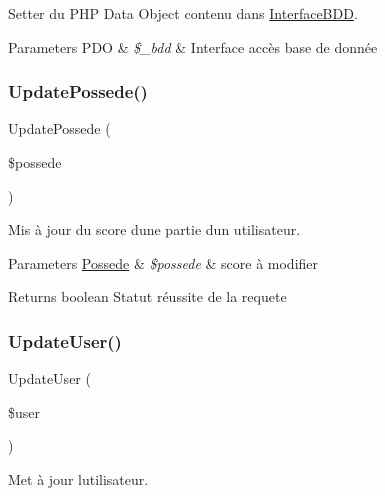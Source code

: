 Setter du P\+HP Data Object contenu dans \mbox{\hyperlink{class_interface_b_d_d}{Interface\+B\+DD}}. 


\begin{DoxyParams}[1]{Parameters}
P\+DO & {\em \$\+\_\+bdd} & Interface accès base de donnée \\
\hline
\end{DoxyParams}
\mbox{\label{class_interface_b_d_d_adff6bf7ab712728f7898296d73bbd71b}} 
\subsubsection{\texorpdfstring{Update\+Possede()}{UpdatePossede()}}
{\footnotesize\ttfamily Update\+Possede (\begin{DoxyParamCaption}\item[{}]{\$possede }\end{DoxyParamCaption})}



Mis à jour du score d\textquotesingle{}une partie d\textquotesingle{}un utilisateur. 


\begin{DoxyParams}[1]{Parameters}
\mbox{\hyperlink{class_possede}{Possede}} & {\em \$possede} & score à modifier\\
\hline
\end{DoxyParams}
\begin{DoxyReturn}{Returns}
boolean Statut réussite de la requete 
\end{DoxyReturn}
\mbox{\label{class_interface_b_d_d_abf7f8811487ce2a1626969ffbfcf7701}} 
\subsubsection{\texorpdfstring{Update\+User()}{UpdateUser()}}
{\footnotesize\ttfamily Update\+User (\begin{DoxyParamCaption}\item[{}]{\$user }\end{DoxyParamCaption})}



Met à jour l\textquotesingle{}utilisateur. 


